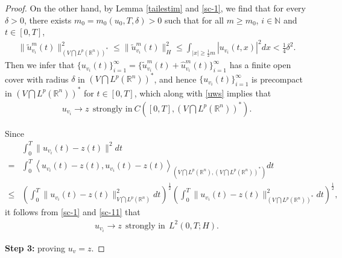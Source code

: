\documentclass[10pt,a4paper]{amsart}
\def\geq{\geqslant}
\def\leq{\leqslant}
\begin{document}
\begin{proof}
    On the other hand, by Lemma \ref{tailestim} and \eqref{sc-1},
    we find that for every $\delta>0$,
    there exists
    $m_0 = m_0 (u_0, T,  \delta ) > 0$
    such that for all $m \geq m_0$, $i \in \mathbb{N}$ and $t \in [0,T]$,
    \begin{align*}
        \| \widetilde{u}_{v_i}^m(t)
        \|_{\left( V \bigcap L^p(\mathbb{R}^n) \right)^\ast}^2
        \leq
        \| \widetilde{u}_{v_i}^m(t)
        \|_{H}^2
        \leq \int_{|x| \geq {\frac 12}  m}
        |u_{v_i}(t,x)|^2
        dx
        < \frac{1}{4}  \delta^2.
    \end{align*}
    Then we infer that
    $\{ u_{v_i}(t) \}_{i=1}^\infty
    =
    \{ \widetilde{u}_{v_i}^m(t)
    + \widehat{u}_{v_i}^m(t)
    \}_{i=1}^\infty$
    has a finite open cover with radius $\delta$ in
    $\left( V \bigcap L^p(\mathbb{R}^n) \right)^\ast$,
    and hence
    $
    \{ u_{v_i}(t) \}_{i=1}^\infty
    $
    is precompact in
    $\left( V \bigcap L^p(\mathbb{R}^n) \right)^\ast$
    for  $t \in [0,T]$,
    which along with \eqref{uws}
    implies that
    \begin{align} \label{sc-11}
        u_{v_i} \rightarrow  z  \ \  \text{strongly in} \  C \left( [0,T], \left( V \bigcap L^p(\mathbb{R}^n) \right)^\ast \right).
    \end{align}

    Since
    \begin{align*}
        & \int_0^T \| u_{v_i}(t) - z(t) \|^2 dt  \nonumber \\
        = & \int_0^T
        \left\langle  u_{v_i}(t) - z(t),
        u_{v_i}(t) - z(t)
        \right\rangle_{\left( V \bigcap L^p(\mathbb{R}^n), \left( V \bigcap L^p(\mathbb{R}^n) \right)^\ast \right)} dt
        \nonumber \\
        \leq & \left( \int_0^T
        \| u_{v_i}(t) - z(t) \|_{V \bigcap L^p(\mathbb{R}^n)}^2 dt
        \right)^{\frac{1}{2}}
        \left( \int_0^T
        \| u_{v_i}(t) - z(t) \|_{\left( V \bigcap L^p(\mathbb{R}^n) \right)^\ast}^2 dt
        \right)^{\frac{1}{2}},
    \end{align*}
    it follows from \eqref{sc-1} and \eqref{sc-11} that
    \begin{align*}
        u_{v_i}  \rightarrow  z  \ \  \text{strongly in} \ \  L^2(0,T; H).
    \end{align*}


    {\bf Step 3:}   proving  $u_v = z$.


\end{proof}
\end{document}
